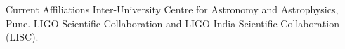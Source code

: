 \begin{rubric}{Current Affiliations}
%
	Inter-University Centre for Astronomy and Astrophysics, Pune.
%
%
%
	LIGO Scientific Collaboration and LIGO-India Scientific Collaboration (LISC).
%
\end{rubric}
